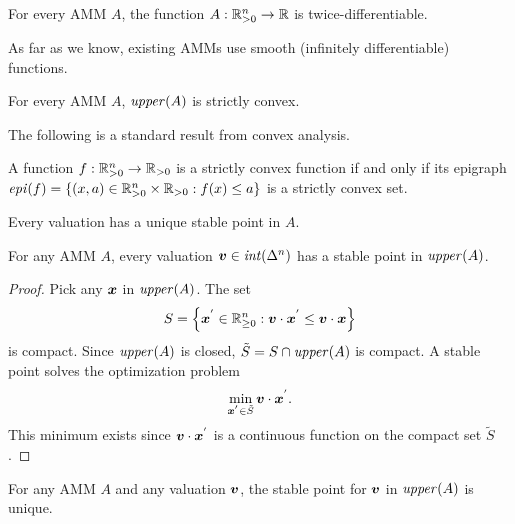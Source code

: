 \begin{axiom}[Continuity]
For every AMM $A$, the function $A:\mathbb{R}_{>0}^n \to \mathbb{R}$
is twice-differentiable.
\end{axiom}
As far as we know,
existing AMMs use smooth (infinitely differentiable) functions.

\begin{axiom}[Convexity]
For every AMM $A$, $\mathit{upper}(A)$ is strictly convex.
\end{axiom}

The following is a standard result from convex analysis.

\begin{lemma}
    A function $f: \mathbb{R}_{>0}^n \to \mathbb{R}_{>0}$ is a strictly convex function if and only if its epigraph \\
    $\mathit{epi}(f) = \left\{ (x,a) \in \mathbb{R}_{>0}^n \times \mathbb{R}_{>0}: f(x) \leq a \right\}$ is a strictly convex set.
\end{lemma}

\begin{axiom}[Expressivity]
Every valuation has a unique stable point in $A$.
\end{axiom}

\begin{lemma}
For any AMM $A$,
every valuation ${\boldsymbol v} \in \mathit{int}(\Delta^n)$ has a stable point in $\mathit{upper}(A)$.
\end{lemma}

\begin{proof}
    Pick any ${\boldsymbol x}$ in $\mathit{upper}(A)$.
    The set 
    \begin{equation*}
        S = \left\{ {\boldsymbol x}^{'} \in \mathbb{R}_{\geq 0}^n:{\boldsymbol v} \cdot {\boldsymbol x}^{'} \leq {\boldsymbol v} \cdot {\boldsymbol x} \right\}
    \end{equation*}
    is compact.
    Since $\mathit{upper}(A)$ is closed, $\tilde{S} = S \cap \mathit{upper}(A)$ is compact.
    A stable point solves the optimization problem
    \begin{equation*}
        \min_{{\boldsymbol x}^{'} \in \tilde{S}} {\boldsymbol v} \cdot {\boldsymbol x}^{'}.
    \end{equation*}
    This minimum exists since ${\boldsymbol v} \cdot {\boldsymbol x}^{'}$
    is a continuous function on the compact set $\tilde{S}$.
\end{proof}

\begin{lemma}%
For any AMM $A$ and any valuation ${\boldsymbol v}$,
the stable point for ${\boldsymbol v}$ in $\mathit{upper}(A)$ is unique.
\end{lemma}

